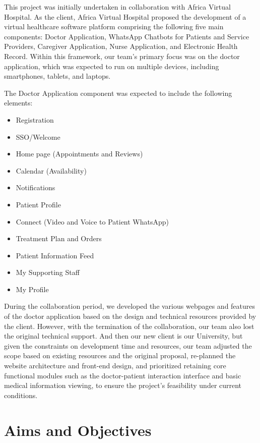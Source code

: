 This project was initially undertaken in collaboration with Africa Virtual Hospital. As the client, Africa Virtual Hospital proposed the development of a virtual healthcare software platform comprising the following five main components: Doctor Application, WhatsApp Chatbots for Patients and Service Providers, Caregiver Application, Nurse Application, and Electronic Health Record. Within this framework, our team's primary focus was on the doctor application, which was expected to run on multiple devices, including smartphones, tablets, and laptops.

The Doctor Application component was expected to include the following elements:

\begin {itemize}
    \item Registration
    \item SSO/Welcome
    \item Home page (Appointments and Reviews)
    \item Calendar (Availability)
    \item Notifications
    \item Patient Profile
    \item Connect (Video and Voice to Patient WhatsApp)
    \item Treatment Plan and Orders
    \item Patient Information Feed
    \item My Supporting Staff
    \item My Profile
\end {itemize}

During the collaboration period, we developed the various webpages and features of the doctor application based on the design and technical resources provided by the client. However, with the termination of the collaboration, our team also lost the original technical support. And then our new client is our University, but given the constraints on development time and resources, our team adjusted the scope based on existing resources and the original proposal, re-planned the website architecture and front-end design, and prioritized retaining core functional modules such as the doctor-patient interaction interface and basic medical information viewing, to ensure the project's feasibility under current conditions.

\section{Aims and Objectives}
\label{sec:sec03}

